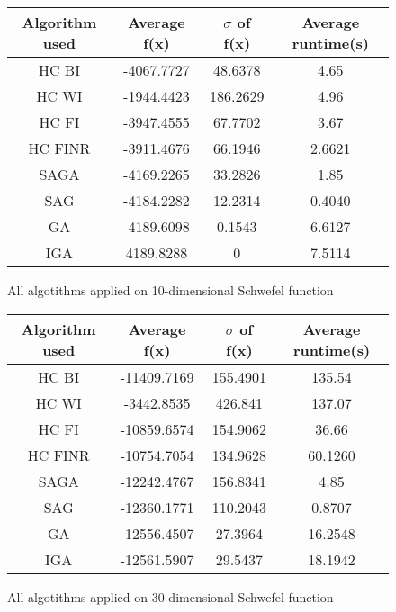 \documentclass{article}
\begin{document}
\begin{figure}[H]
	\begin{tabular}{|c||c|c|c|} \hline
		Algorithm used & Average f(x) & $\sigma$ of f(x) & Average runtime(s) \\ \hline \hline
		HC BI & -4067.7727 & 48.6378 & 4.65 \\ \hline
		HC WI & -1944.4423 & 186.2629 & 4.96 \\ \hline
		HC FI & -3947.4555 & 67.7702 & 3.67 \\ \hline
		HC FINR & -3911.4676 & 66.1946 & 2.6621 \\ \hline
		SAGA & -4169.2265 & 33.2826 & 1.85 \\ \hline
		SAG & -4184.2282 & 12.2314 & 0.4040 \\ \hline
        GA & -4189.6098 & 0.1543 & 6.6127 \\ \hline
		IGA & 4189.8288 & 0 & 7.5114 \\ \hline
\end{tabular}
\caption{All algotithms applied on 10-dimensional Schwefel function}
\end{figure}

\begin{figure}[H]
	\begin{tabular}{|c||c|c|c|} \hline
		Algorithm used & Average f(x) & $\sigma$ of f(x) & Average runtime(s) \\ \hline \hline
		HC BI & -11409.7169 & 155.4901 & 135.54 \\ \hline
		HC WI & -3442.8535 & 426.841 & 137.07 \\ \hline
		HC FI & -10859.6574 & 154.9062 & 36.66 \\ \hline
		HC FINR & -10754.7054 & 134.9628 & 60.1260 \\ \hline
		SAGA & -12242.4767 & 156.8341 & 4.85 \\ \hline
		SAG & -12360.1771 & 110.2043 & 0.8707 \\ \hline
        GA & -12556.4507 & 27.3964 & 16.2548 \\ \hline
		IGA & -12561.5907 & 29.5437 & 18.1942 \\ \hline
\end{tabular}
\caption{All algotithms applied on 30-dimensional Schwefel function}
\end{figure}
\end{document}

